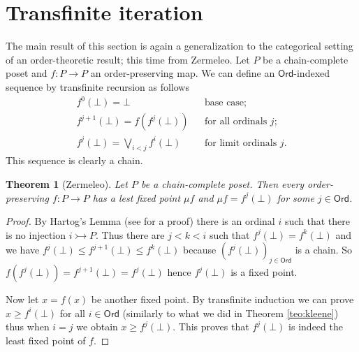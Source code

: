\documentclass[letterpaper, 11pt, oneside]{memoir}
\theoremstyle{myteo}
\newtheorem{theorem}{Theorem}[section]
\numberwithin{equation}{section}
\newcommand{\Ord}{\textsf{Ord}}
\begin{document}
\section{Transfinite iteration}

The main result of this section is again a generalization to the categorical setting of an order-theoretic result; this time from Zermeleo.
Let \(P\) be a chain-complete poset and \(f : P \to P\) an order-preserving map.
We can define an \(\Ord\)-indexed sequence by transfinite recursion as follows
\begin{align*}
  f^0(\bot) = \bot && \text{base case;}\\
  f^{j+1}(\bot) = f(f^j(\bot)) && \text{for all ordinals \(j\);} \\
  f^j(\bot) = \bigvee_{i < j}f^i(\bot) && \text{for limit ordinals \(j\).}
\end{align*}
This sequence is clearly a chain.

\begin{theorem}[Zermeleo]
  \label{teo:zermeleo}
  Let \(P\) be a chain-complete poset.
  Then every order-preserving \(f : P \to P\) has a lest fixed point \(\mu f\) and \(\mu f = f^j(\bot)\) for some \(j \in \Ord\).
\end{theorem}

\begin{proof}
  By Hartog's Lemma (see \cite[Theorem 8.18]{goldrei} for a proof) there is an ordinal \(i\) such that there is no injection \(i \rightarrowtail P\).
  Thus there are \(j < k < i\) such that \(f^j(\bot) = f^k(\bot)\) and we have \(f^j(\bot) \leq f^{j+1}(\bot) \leq f^k(\bot)\) because \((f^j(\bot))_{j\in\Ord}\) is a chain.
  So \(f(f^j(\bot)) = f^{j+1}(\bot) = f^j(\bot)\) hence \(f^j(\bot)\) is a fixed point.

  Now let \(x = f(x)\) be another fixed point.
  By transfinite induction we can prove \(x \geq f^i(\bot)\) for all \(i \in \Ord\) (similarly to what we did in Theorem \ref{teo:kleene}) thus when \(i = j\) we obtain \(x \geq f^j(\bot)\).
  This proves that \(f^j(\bot)\) is indeed the least fixed point of \(f\).
\end{proof}
\end{document}
